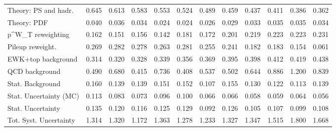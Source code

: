 \begin{tabular}{l|p{0.6cm}p{0.6cm}p{0.6cm}p{0.6cm}p{0.6cm}p{0.6cm}p{0.6cm}p{0.6cm}p{0.6cm}p{0.6cm}p{0.6cm}}
Theory: PS and hadr.                     & 0.645 & 0.613 & 0.583 & 0.553 & 0.524 & 0.489 & 0.459 & 0.437 & 0.411 & 0.386 & 0.362 \\
Theory: PDF                              & 0.040 & 0.036 & 0.034 & 0.024 & 0.024 & 0.026 & 0.029 & 0.033 & 0.035 & 0.035 & 0.034 \\
p^{W}_{T} reweighting                    & 0.162 & 0.151 & 0.156 & 0.142 & 0.181 & 0.172 & 0.201 & 0.219 & 0.223 & 0.223 & 0.231 \\
Pileup reweight.                         & 0.269 & 0.282 & 0.278 & 0.263 & 0.281 & 0.255 & 0.241 & 0.182 & 0.183 & 0.154 & 0.061 \\
EWK+top background                       & 0.314 & 0.320 & 0.328 & 0.339 & 0.356 & 0.369 & 0.395 & 0.398 & 0.412 & 0.419 & 0.438 \\
QCD background                           & 0.490 & 0.680 & 0.415 & 0.736 & 0.408 & 0.537 & 0.502 & 0.644 & 0.886 & 1.200 & 0.839 \\
Stat. Background                         & 0.160 & 0.139 & 0.139 & 0.151 & 0.152 & 0.107 & 0.155 & 0.130 & 0.122 & 0.113 & 0.139 \\
Stat. Uncertainty (MC)                   & 0.113 & 0.083 & 0.073 & 0.096 & 0.100 & 0.066 & 0.066 & 0.058 & 0.059 & 0.064 & 0.056 \\
\hline
Stat. Uncertainty                        & 0.135 & 0.120 & 0.116 & 0.125 & 0.129 & 0.092 & 0.126 & 0.105 & 0.107 & 0.099 & 0.108 \\
\hline
Tot. Syst. Uncertainty                   & 1.314 & 1.320 & 1.172 & 1.363 & 1.278 & 1.233 & 1.327 & 1.347 & 1.515 & 1.800 & 1.668 \\
\hline
\end{tabular}
